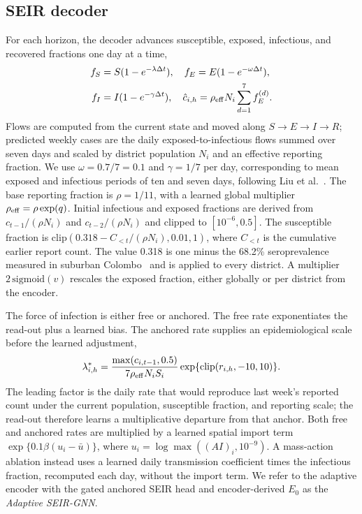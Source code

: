 \documentclass[conference]{IEEEtran}
\begin{document}
\subsection{SEIR decoder}
For each horizon, the decoder advances susceptible, exposed, infectious, and recovered fractions one day at a time,
\begin{equation}
\begin{aligned}
f_S&=S(1-e^{-\lambda\Delta t}),\quad f_E=E(1-e^{-\omega\Delta t}),\\
f_I&=I(1-e^{-\gamma\Delta t}),\quad
\hat c_{i,h}=\rho_{\rm eff}N_i\sum_{d=1}^{7} f_E^{(d)}.
\end{aligned}
\label{eq:seir}
\end{equation}
Flows are computed from the current state and moved along $S\rightarrow E\rightarrow I\rightarrow R$; predicted weekly cases are the daily exposed-to-infectious flows summed over seven days and scaled by district population $N_i$ and an effective reporting fraction.
We use $\omega=0.7/7=0.1$ and $\gamma=1/7$ per day, corresponding to mean exposed and infectious periods of ten and seven days, following Liu et al.~\cite{liu2025seirlstm}. %
The base reporting fraction is $\rho=1/11$, with a learned global multiplier $\rho_{\rm eff}=\rho\exp(q)$. %
Initial infectious and exposed fractions are derived from $c_{t-1}/(\rho N_i)$ and $c_{t-2}/(\rho N_i)$ and clipped to $[10^{-6},0.5]$. %
The susceptible fraction is $\mathrm{clip}(0.318-C_{<t}/(\rho N_i),0.01,1)$, where $C_{<t}$ is the cumulative earlier report count. %
The value 0.318 is one minus the 68.2\% seroprevalence measured in suburban Colombo~\cite{jeewandara2015sero} and is applied to every district. %
A multiplier $2\,\mathrm{sigmoid}(v)$ rescales the exposed fraction, either globally or per district from the encoder. %

The force of infection is either free or anchored.
The free rate exponentiates the read-out plus a learned bias.
The anchored rate supplies an epidemiological scale before the learned adjustment,
\begin{equation}
\lambda^*_{i,h}=\frac{\max(c_{i,t-1},0.5)}{7\rho_{\rm eff}N_iS_i}
\exp\{\mathrm{clip}(r_{i,h},-10,10)\}.
\label{eq:anchor}
\end{equation}
The leading factor is the daily rate that would reproduce last week's reported count under the current population, susceptible fraction, and reporting scale; the read-out therefore learns a multiplicative departure from that anchor.
Both free and anchored rates are multiplied by a learned spatial import term $\exp\{0.1\beta(u_i-\bar u)\}$, where $u_i=\log\max((AI)_i,10^{-9})$. %
A mass-action ablation instead uses a learned daily transmission coefficient times the infectious fraction, recomputed each day, without the import term.
We refer to the adaptive encoder with the gated anchored SEIR head and encoder-derived $E_0$ as the \emph{Adaptive SEIR-GNN}.
\end{document}
